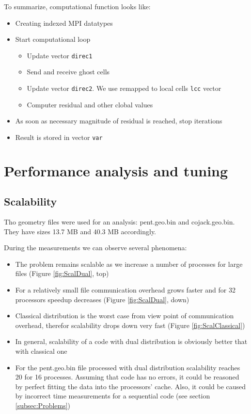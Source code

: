 \documentclass[12pt, a4paper]{article}
\begin{document}
To summarize, computational function looks like:
\begin{itemize}
	\item Creating indexed MPI datatypes
	\item Start computational loop
	\begin{itemize}
		\item Update vector \texttt{direc1}
		\item Send and receive ghost cells
		\item Update vector \texttt{direc2}. We use remapped to local cells \texttt{lcc} vector
		\item Computer residual and other clobal values
	\end{itemize}
	\item As soon as necessary magnitude of residual is reached, stop iterations
	\item Result is stored in vector \texttt{var}
\end{itemize}



\section{Performance analysis and tuning}

\subsection{Scalability}

Tho geometry files were used for an analysis: pent.geo.bin and cojack.geo.bin.
They have sizes 13.7 MB and 40.3 MB accordingly.

During the measurements we can observe several phenomena:
\begin{itemize}
	\item The problem remains scalable as we increase a number of processes for large files (Figure \ref{fig:ScalDual}, top)
	\item For a relatively small file communication overhead grows faster and for 32 processors speedup decreases (Figure \ref{fig:ScalDual}, down)
	\item Classical distribution is the worst case from view point of communication overhead, therefor scalability drops down very fast (Figure \ref{fig:ScalClassical})
	\item In general, scalability of a code with dual distribution is obviously better that with classical one
	\item For the pent.geo.bin file processed with dual distribution scalability reaches 20 for 16 processes. 
	Assuming that code has no errors, it could be reasoned by perfect fitting the data into the processors' cache.
	Also, it could be caused by incorrect time measurements for a sequential code (see section \ref{subsec:Problems})
\end{itemize}
\end{document}
